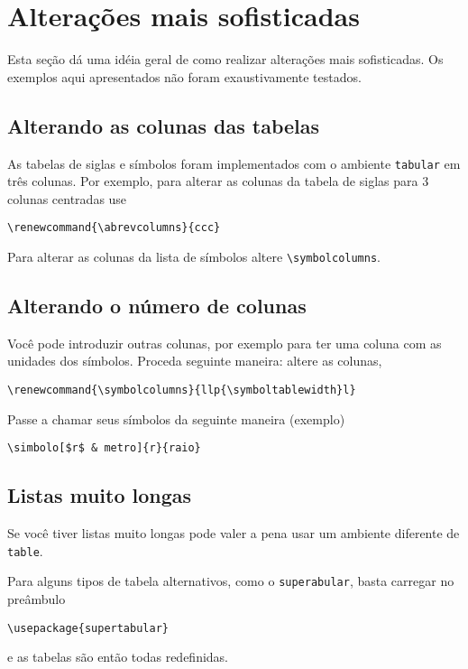 \documentclass[espacosimples]{abnt}
\begin{document}
\section{Alterações mais sofisticadas}

Esta seção dá uma idéia geral de como realizar alterações mais sofisticadas.
Os exemplos aqui apresentados não foram exaustivamente testados.

\subsection{Alterando as colunas das tabelas}

As tabelas de siglas e símbolos foram implementados com o ambiente {\tt tabular}
em três colunas. Por exemplo, para alterar as colunas da tabela de siglas para 3 colunas centradas
use
\begin{verbatim}
\renewcommand{\abrevcolumns}{ccc}
\end{verbatim}
Para alterar as colunas da lista de símbolos altere \verb+\symbolcolumns+.

\subsection{Alterando o número de colunas}

Você pode introduzir outras colunas, por exemplo para ter uma coluna com
as unidades dos símbolos.
Proceda seguinte maneira: altere as colunas,
\begin{verbatim}
\renewcommand{\symbolcolumns}{llp{\symboltablewidth}l}
\end{verbatim}
Passe a chamar seus símbolos da seguinte maneira (exemplo)
\begin{verbatim}
\simbolo[$r$ & metro]{r}{raio}
\end{verbatim}

\subsection{Listas muito longas}

Se você tiver listas muito longas pode valer a pena
usar um ambiente diferente de {\tt table}.

Para alguns tipos de tabela alternativos, como o {\tt superabular}, 
basta carregar no preâmbulo
\begin{verbatim}
\usepackage{supertabular}
\end{verbatim}
e as tabelas são então todas redefinidas.
\end{document}
